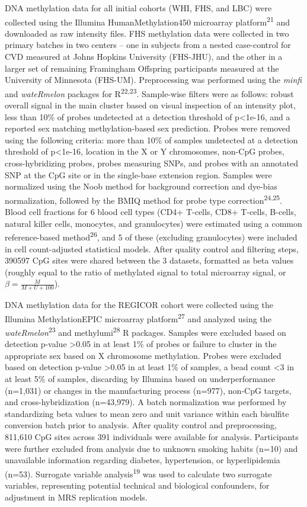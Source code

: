 \documentclass[]{article}
\begin{document}
DNA methylation data for all initial cohorts (WHI, FHS, and LBC) were
collected using the Illumina HumanMethylation450 microarray
platform\textsuperscript{21} and downloaded as raw intensity files. FHS
methylation data were collected in two primary batches in two centers --
one in subjects from a nested case-control for CVD measured at Johns
Hopkins University (FHS-JHU), and the other in a larger set of remaining
Framingham Offspring participants measured at the University of
Minnesota (FHS-UM). Preprocessing was performed using the \emph{minfi}
and \emph{wateRmelon} packages for R\textsuperscript{22,23}. Sample-wise
filters were as follows: robust overall signal in the main cluster based
on visual inspection of an intensity plot, less than 10\% of probes
undetected at a detection threshold of p\textless{}1e-16, and a reported
sex matching methylation-based sex prediction. Probes were removed using
the following criteria: more than 10\% of samples undetected at a
detection threshold of p\textless{}1e-16, location in the X or Y
chromosomes, non-CpG probes, cross-hybridizing probes, probes measuring
SNPs, and probes with an annotated SNP at the CpG site or in the
single-base extension region. Samples were normalized using the Noob
method for background correction and dye-bias normalization, followed by
the BMIQ method for probe type correction\textsuperscript{24,25}. Blood
cell fractions for 6 blood cell types (CD4+ T-cells, CD8+ T-cells,
B-cells, natural killer cells, monocytes, and granulocytes) were
estimated using a common reference-based method\textsuperscript{26}, and
5 of these (excluding granulocytes) were included in cell count-adjusted
statistical models. After quality control and filtering steps, 390597
CpG sites were shared between the 3 datasets, formatted as beta values
(roughly equal to the ratio of methylated signal to total microarray
signal, or \(\beta=\frac{M}{M+U+100}\)).

DNA methylation data for the REGICOR cohort were collected using the
Illumina MethylationEPIC microarray platform\textsuperscript{27} and
analyzed using the \emph{wateRmelon}\textsuperscript{23} and
methylumi\textsuperscript{28} R packages. Samples were excluded based on
detection p-value \textgreater{}0.05 in at least 1\% of probes or
failure to cluster in the appropriate sex based on X chromosome
methylation. Probes were excluded based on detection p-value
\textgreater{}0.05 in at least 1\% of samples, a bead count \textless{}3
in at least 5\% of samples, discarding by Illumina based on
underperformance (n=1,031) or changes in the manufacturing process
(n=977), non-CpG targets, and cross-hybridization (n=43,979). A batch
normalization was performed by standardizing beta values to mean zero
and unit variance within each bisulfite conversion batch prior to
analysis. After quality control and preprocessing, 811,610 CpG sites
across 391 individuals were available for analysis. Participants were
further excluded from analysis due to unknown smoking habits (n=10) and
unavailable information regarding diabetes, hypertension, or
hyperlipidemia (n=53). Surrogate variable analysis\textsuperscript{19}
was used to calculate two surrogate variables, representing potential
technical and biological confounders, for adjustment in MRS replication
models.
\end{document}
